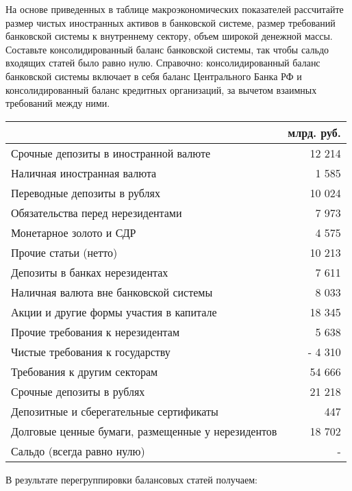 \documentclass[12pt, table]{exam}
\begin{document}
\setcounter{section}{0\relax}%
\noindent
\normalsize

\begin{questions}
\question[15] На основе приведенных в таблице макроэкономических показателей рассчитайте размер чистых иностранных активов в банковской системе, размер требований банковской системы к внутреннему сектору, объем широкой денежной массы. Составьте консолидированный баланс банковской системы, так чтобы сальдо входящих статей было равно нулю. Справочно: консолидированный баланс банковской системы включает в себя баланс Центрального Банка РФ и консолидированный баланс кредитных организаций, за вычетом взаимных требований между ними.

\small
\begin{tabularx}{\linewidth}[b]{@{}>{\raggedright\arraybackslash}Xr@{}}				& млрд. руб.\\
	\toprule
    Срочные депозиты в иностранной валюте &    12 214    \\
	Наличная иностранная валюта &      1 585    \\
	Переводные депозиты в рублях &    10 024    \\
	Обязательства перед нерезидентами &      7 973    \\
	Монетарное золото и СДР &      4 575    \\
	Прочие статьи (нетто) &    10 213    \\
	Депозиты в банках нерезидентах &      7 611    \\
	Наличная валюта вне банковской системы &      8 033    \\
	Акции и другие формы участия в капитале &    18 345    \\
	Прочие требования к нерезидентам &      5 638    \\
	Чистые требования к государству & -   4 310    \\
	Требования к другим секторам &    54 666    \\
	Срочные депозиты в рублях &    21 218    \\
	Депозитные и сберегательные сертификаты &         447    \\
	Долговые ценные бумаги, размещенные у нерезидентов &    18 702    \\
	Сальдо (всегда равно нулю) &           -      \\
	\bottomrule
\end{tabularx}%
\normalsize

\begin{solution}[6em] В результате перегруппировки балансовых статей получаем:
	

\end{solution}
\end{questions}
\end{document}
